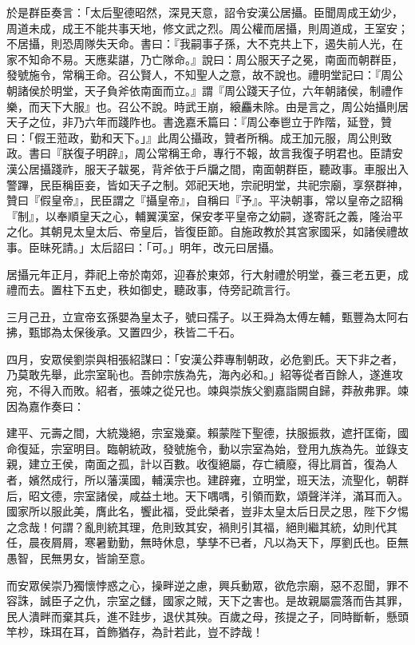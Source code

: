 \begin{pinyinscope}
於是群臣奏言：「太后聖德昭然，深見天意，詔令安漢公居攝。臣聞周成王幼少，周道未成，成王不能共事天地，修文武之烈。周公權而居攝，則周道成，王室安；不居攝，則恐周隊失天命。書曰：『我嗣事子孫，大不克共上下，遏失前人光，在家不知命不易。天應棐諶，乃亡隊命。』說曰：周公服天子之冕，南面而朝群臣，發號施令，常稱王命。召公賢人，不知聖人之意，故不說也。禮明堂記曰：『周公朝諸侯於明堂，天子負斧依南面而立。』謂『周公踐天子位，六年朝諸侯，制禮作樂，而天下大服』也。召公不說。時武王崩，縗麤未除。由是言之，周公始攝則居天子之位，非乃六年而踐阼也。書逸嘉禾篇曰：『周公奉鬯立于阼階，延登，贊曰：「假王蒞政，勤和天下。」』此周公攝政，贊者所稱。成王加元服，周公則致政。書曰『朕復子明辟』，周公常稱王命，專行不報，故言我復子明君也。臣請安漢公居攝踐祚，服天子韍冕，背斧依于戶牖之間，南面朝群臣，聽政事。車服出入警蹕，民臣稱臣妾，皆如天子之制。郊祀天地，宗祀明堂，共祀宗廟，享祭群神，贊曰『假皇帝』，民臣謂之『攝皇帝』，自稱曰『予』。平決朝事，常以皇帝之詔稱『制』，以奉順皇天之心，輔翼漢室，保安孝平皇帝之幼嗣，遂寄託之義，隆治平之化。其朝見太皇太后、帝皇后，皆復臣節。自施政教於其宮家國采，如諸侯禮故事。臣昧死請。」太后詔曰：「可。」明年，改元曰居攝。

居攝元年正月，莽祀上帝於南郊，迎春於東郊，行大射禮於明堂，養三老五更，成禮而去。置柱下五史，秩如御史，聽政事，侍旁記疏言行。

三月己丑，立宣帝玄孫嬰為皇太子，號曰孺子。以王舜為太傅左輔，甄豐為太阿右拂，甄邯為太保後承。又置四少，秩皆二千石。

四月，安眾侯劉崇與相張紹謀曰：「安漢公莽專制朝政，必危劉氏。天下非之者，乃莫敢先舉，此宗室恥也。吾帥宗族為先，海內必和。」紹等從者百餘人，遂進攻宛，不得入而敗。紹者，張竦之從兄也。竦與崇族父劉嘉詣闕自歸，莽赦弗罪。竦因為嘉作奏曰：

建平、元壽之間，大統幾絕，宗室幾棄。賴蒙陛下聖德，扶服振救，遮扞匡衛，國命復延，宗室明目。臨朝統政，發號施令，動以宗室為始，登用九族為先。並錄支親，建立王侯，南面之孤，計以百數。收復絕屬，存亡續廢，得比肩首，復為人者，嬪然成行，所以藩漢國，輔漢宗也。建辟雍，立明堂，班天法，流聖化，朝群后，昭文德，宗室諸侯，咸益土地。天下喁喁，引領而歎，頌聲洋洋，滿耳而入。國家所以服此美，膺此名，饗此福，受此榮者，豈非太皇太后日昃之思，陛下夕惕之念哉！何謂？亂則統其理，危則致其安，禍則引其福，絕則繼其統，幼則代其任，晨夜屑屑，寒暑勤勤，無時休息，孳孳不已者，凡以為天下，厚劉氏也。臣無愚智，民無男女，皆諭至意。

而安眾侯崇乃獨懷悖惑之心，操畔逆之慮，興兵動眾，欲危宗廟，惡不忍聞，罪不容誅，誠臣子之仇，宗室之讎，國家之賊，天下之害也。是故親屬震落而告其罪，民人潰畔而棄其兵，進不跬步，退伏其殃。百歲之母，孩提之子，同時斷斬，懸頭竿杪，珠珥在耳，首飾猶存，為計若此，豈不誖哉！


\end{pinyinscope}
